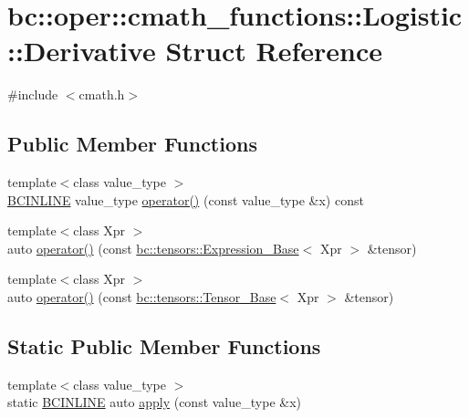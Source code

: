 \hypertarget{structbc_1_1oper_1_1cmath__functions_1_1Logistic_1_1Derivative}{}\section{bc\+:\+:oper\+:\+:cmath\+\_\+functions\+:\+:Logistic\+:\+:Derivative Struct Reference}
\label{structbc_1_1oper_1_1cmath__functions_1_1Logistic_1_1Derivative}


{\ttfamily \#include $<$cmath.\+h$>$}

\subsection*{Public Member Functions}
\begin{DoxyCompactItemize}
\item 
{\footnotesize template$<$class value\+\_\+type $>$ }\\\hyperlink{common_8h_a6699e8b0449da5c0fafb878e59c1d4b1}{B\+C\+I\+N\+L\+I\+NE} value\+\_\+type \hyperlink{structbc_1_1oper_1_1cmath__functions_1_1Logistic_1_1Derivative_a2b3b2693acf6288837c45fdbde6a44f4}{operator()} (const value\+\_\+type \&x) const
\item 
{\footnotesize template$<$class Xpr $>$ }\\auto \hyperlink{structbc_1_1oper_1_1cmath__functions_1_1Logistic_1_1Derivative_aaec7e71698782070dd4409aba9f55120}{operator()} (const \hyperlink{classbc_1_1tensors_1_1Expression__Base}{bc\+::tensors\+::\+Expression\+\_\+\+Base}$<$ Xpr $>$ \&tensor)
\item 
{\footnotesize template$<$class Xpr $>$ }\\auto \hyperlink{structbc_1_1oper_1_1cmath__functions_1_1Logistic_1_1Derivative_a35d896370c03caaca82a347e3498906c}{operator()} (const \hyperlink{classbc_1_1tensors_1_1Tensor__Base}{bc\+::tensors\+::\+Tensor\+\_\+\+Base}$<$ Xpr $>$ \&tensor)
\end{DoxyCompactItemize}
\subsection*{Static Public Member Functions}
\begin{DoxyCompactItemize}
\item 
{\footnotesize template$<$class value\+\_\+type $>$ }\\static \hyperlink{common_8h_a6699e8b0449da5c0fafb878e59c1d4b1}{B\+C\+I\+N\+L\+I\+NE} auto \hyperlink{structbc_1_1oper_1_1cmath__functions_1_1Logistic_1_1Derivative_a3a6678070d972fe6d211fe0c6785d718}{apply} (const value\+\_\+type \&x)
\end{DoxyCompactItemize}


